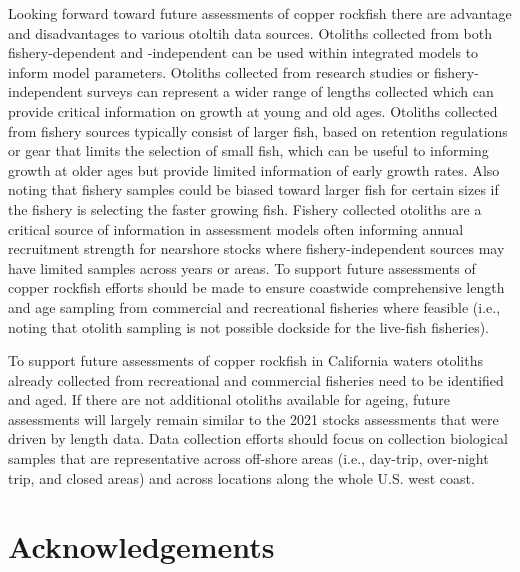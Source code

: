 \documentclass[11pt,
  english,
  a4paper,
]{article}
\begin{document}
\leavevmode\tagmcend\tagstructend


Looking forward toward future assessments of copper rockfish there are advantage and disadvantages to various otoltih data sources. Otoliths collected from both fishery-dependent and -independent can be used within integrated models to inform model parameters. Otoliths collected from research studies or fishery-independent surveys can represent a wider range of lengths collected which can provide critical information on growth at young and old ages. Otoliths collected from fishery sources typically consist of larger fish, based on retention regulations or gear that limits the selection of small fish, which can be useful to informing growth at older ages but provide limited information of early growth rates. Also noting that fishery samples could be biased toward larger fish for certain sizes if the fishery is selecting the faster growing fish. Fishery collected otoliths are a critical source of information in assessment models often informing annual recruitment strength for nearshore stocks where fishery-independent sources may have limited samples across years or areas. To support future assessments of copper rockfish efforts should be made to ensure coastwide comprehensive length and age sampling from commercial and recreational fisheries where feasible (i.e., noting that otolith sampling is not possible dockside for the live-fish fisheries).

\leavevmode\tagmcend\tagstructend\par


To support future assessments of copper rockfish in California waters otoliths already collected from recreational and commercial fisheries need to be identified and aged. If there are not additional otoliths available for ageing, future assessments will largely remain similar to the 2021 stocks assessments that were driven by length data. Data collection efforts should focus on collection biological samples that are representative across off-shore areas (i.e., day-trip, over-night trip, and closed areas) and across locations along the whole U.S. west coast.

\leavevmode\tagmcend\tagstructend\par


\hypertarget{acknowledgements}{%
\section{Acknowledgements}\label{acknowledgements}}
\end{document}
